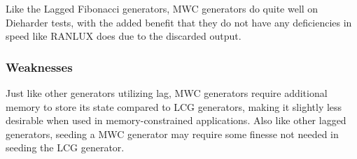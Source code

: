 Like the Lagged Fibonacci generators, MWC generators do quite well on Dieharder tests, with the added benefit that they do not have any deficiencies in speed like RANLUX does due to the discarded output.

\subsubsection{Weaknesses}
Just like other generators utilizing lag, MWC generators require additional memory to store its state compared to LCG generators, making it slightly less desirable when used in memory-constrained applications. Also like other lagged generators, seeding a MWC generator may require some finesse not needed in seeding the LCG generator.
